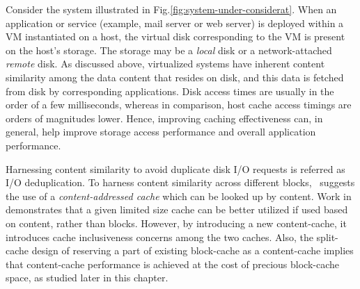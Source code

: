 Consider the system illustrated in Fig.\ref{fig:system-under-considerat}.
When an application or service (example, mail server or web server) is deployed 
within a VM instantiated on a host,
the virtual disk corresponding to the VM is present on the host's storage.
The storage may be a \textit{local} disk or a network-attached
\textit{remote} disk.
As discussed above, virtualized systems have inherent content similarity
among the data content that resides on disk, and this data is fetched 
from disk by corresponding applications. 
Disk access times are usually in the order of a few 
milliseconds\cite{google, data-domain}, whereas in comparison, 
host cache access timings are orders of magnitudes lower\cite{pagecache}. 
Hence, improving caching
effectiveness can, in general, help improve storage access performance
and overall application performance.


Harnessing content similarity 
to avoid duplicate disk I/O requests %
is referred as I/O deduplication.
To harness content similarity across different blocks,~\cite{iodedup} 
suggests the use of a 
\textit{content-addressed cache} which can be looked up by content.
Work in \cite{iodedup} demonstrates that a 
given limited size cache can be better utilized if used based on
content, rather than blocks.
However, by introducing a new content-cache, it introduces
cache inclusiveness concerns among the two caches. Also, the
split-cache design of reserving a part of existing block-cache as
a content-cache implies that content-cache performance is
achieved at the cost of precious block-cache space, as studied later
in this chapter.

